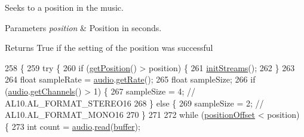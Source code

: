 Seeks to a position in the music.


\begin{DoxyParams}{Parameters}
{\em position} & Position in seconds. \\
\hline
\end{DoxyParams}
\begin{DoxyReturn}{Returns}
True if the setting of the position was successful 
\end{DoxyReturn}

\begin{DoxyCode}
258                                                \{
259         \textcolor{keywordflow}{try} \{
260             \textcolor{keywordflow}{if} (\mbox{\hyperlink{classorg_1_1newdawn_1_1slick_1_1openal_1_1_open_a_l_stream_player_a9abaf98266809fa03b92f42744a3d332}{getPosition}}() > position) \{
261                 \mbox{\hyperlink{classorg_1_1newdawn_1_1slick_1_1openal_1_1_open_a_l_stream_player_a765f3c95de540350a0ed4902a6d9792a}{initStreams}}();
262             \}
263 
264             \textcolor{keywordtype}{float} sampleRate = \mbox{\hyperlink{classorg_1_1newdawn_1_1slick_1_1openal_1_1_open_a_l_stream_player_a694870dca2079ff6e6269a394a126d17}{audio}}.\mbox{\hyperlink{interfaceorg_1_1newdawn_1_1slick_1_1openal_1_1_audio_input_stream_a461c4ad4304ff8d75693c93e525e0f85}{getRate}}();
265             \textcolor{keywordtype}{float} sampleSize;
266             \textcolor{keywordflow}{if} (\mbox{\hyperlink{classorg_1_1newdawn_1_1slick_1_1openal_1_1_open_a_l_stream_player_a694870dca2079ff6e6269a394a126d17}{audio}}.\mbox{\hyperlink{interfaceorg_1_1newdawn_1_1slick_1_1openal_1_1_audio_input_stream_a2bee5322dd7878c18fa8f16bd52bbdfa}{getChannels}}() > 1) \{
267                 sampleSize = 4; \textcolor{comment}{// AL10.AL\_FORMAT\_STEREO16}
268             \} \textcolor{keywordflow}{else} \{
269                 sampleSize = 2; \textcolor{comment}{// AL10.AL\_FORMAT\_MONO16}
270             \}
271 
272             \textcolor{keywordflow}{while} (\mbox{\hyperlink{classorg_1_1newdawn_1_1slick_1_1openal_1_1_open_a_l_stream_player_a41556aeb2058a1c2dd04177e1d61d43c}{positionOffset}} < position) \{
273                 \textcolor{keywordtype}{int} count = \mbox{\hyperlink{classorg_1_1newdawn_1_1slick_1_1openal_1_1_open_a_l_stream_player_a694870dca2079ff6e6269a394a126d17}{audio}}.\mbox{\hyperlink{interfaceorg_1_1newdawn_1_1slick_1_1openal_1_1_audio_input_stream_a4e9ee99faa0551bca581a985e262d619}{read}}(\mbox{\hyperlink{classorg_1_1newdawn_1_1slick_1_1openal_1_1_open_a_l_stream_player_a43f0da73ce6a383cda06b37d7927f58f}{buffer}});

\end{DoxyCode}
